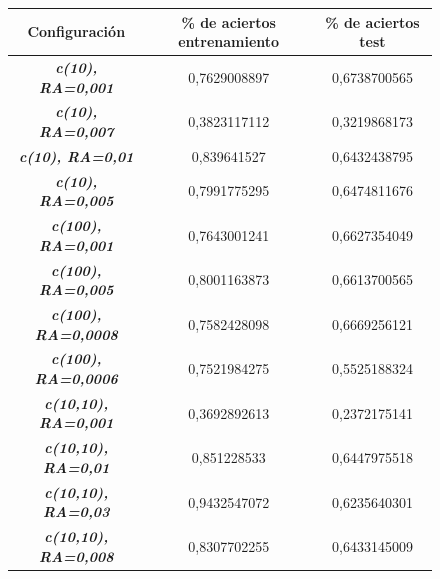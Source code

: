 \documentclass{uc3mpracticas}
\begin{document}
\begin{figure}[!h]
\begin{center}
  \begin{tabular}{|c|c|c|}
    \hline
    \rowcolor{Gray}
                  \textbf{Configuración}                        & \textbf{\% de aciertos entrenamiento} & \textbf{\% de aciertos test}\\ \hline \hline
        \rowcolor{LightGreen}
        \textit{\textbf{c(10), RA=0,001}} &  0,7629008897                         &  0,6738700565               \\ \hline
        \textit{\textbf{c(10), RA=0,007}} &  0,3823117112                         &  0,3219868173               \\ \hline
        \textit{\textbf{c(10), RA=0,01}}  &  0,839641527                          &  0,6432438795               \\ \hline
        \textit{\textbf{c(10), RA=0,005}} &  0,7991775295                         &  0,6474811676               \\ \hline \hline \hline

        \textit{\textbf{c(100), RA=0,001}}&  0,7643001241                         &  0,6627354049               \\ \hline
        \textit{\textbf{c(100), RA=0,005}}&  0,8001163873                         &  0,6613700565               \\ \hline
        \rowcolor{LightGreen}
        \textit{\textbf{c(100), RA=0,0008}}&  0,7582428098                         &  0,6669256121               \\ \hline
        \textit{\textbf{c(100), RA=0,0006}}&  0,7521984275                         &  0,5525188324               \\ \hline \hline \hline

        \textit{\textbf{c(10,10), RA=0,001}}&  0,3692892613                         &  0,2372175141               \\ \hline
        \rowcolor{LightGreen}
        \textit{\textbf{c(10,10), RA=0,01}}&  0,851228533                         &  0,6447975518               \\ \hline
        \textit{\textbf{c(10,10), RA=0,03}}&  0,9432547072                         &  0,6235640301               \\ \hline
        \textit{\textbf{c(10,10), RA=0,008}}&  0,8307702255                         &  0,6433145009               \\ \hline \hline \hline


\end{tabular}
\end{center}
\end{figure}
\end{document}
